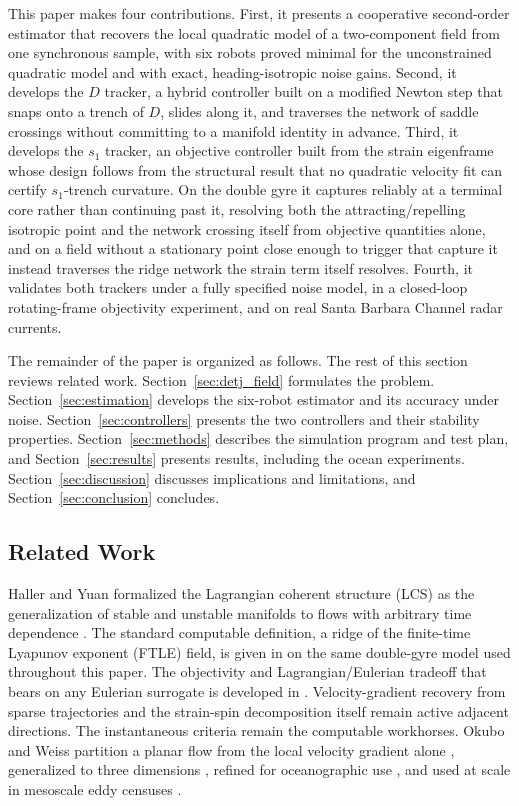 \documentclass[lettersize,journal]{IEEEtran}
\begin{document}
This paper makes four contributions. First, it presents a cooperative
second-order estimator that recovers the local quadratic model of a
two-component field from one synchronous sample, with six robots proved
minimal for the unconstrained quadratic model and with exact,
heading-isotropic noise gains. Second, it
develops the $D$ tracker, a hybrid controller built on a modified
Newton step that snaps onto a trench of $D$, slides along it, and
traverses the network of saddle crossings without committing to a
manifold identity in advance. Third, it develops the
$s_1$ tracker, an objective controller built from the strain
eigenframe whose design follows from the structural result that no
quadratic velocity fit can certify $s_1$-trench curvature. On the
double gyre it captures reliably at a terminal core rather than
continuing past it, resolving both the attracting/repelling isotropic
point and the network crossing itself from objective quantities alone,
and on a field without a stationary point close enough to trigger that
capture it instead traverses the ridge network the strain term itself
resolves. Fourth, it validates both trackers under a fully specified
noise model, in a closed-loop rotating-frame objectivity experiment,
and on real Santa Barbara Channel radar currents.

The remainder of the paper is organized as follows. The rest of this
section reviews related work. Section~\ref{sec:detj_field} formulates
the problem. Section~\ref{sec:estimation} develops the six-robot
estimator and its accuracy under noise. Section~\ref{sec:controllers}
presents the two controllers and their stability properties.
Section~\ref{sec:methods}
describes the simulation program and test plan, and
Section~\ref{sec:results} presents results, including the ocean
experiments. Section~\ref{sec:discussion} discusses implications and
limitations, and Section~\ref{sec:conclusion} concludes.

\subsection{Related Work}
\label{sec:related_robots}

Haller and Yuan formalized the Lagrangian coherent structure (LCS) as
the generalization of stable and unstable manifolds to flows with
arbitrary time dependence \cite{13}. The standard computable definition,
a ridge of the finite-time Lyapunov exponent (FTLE) field, is given in
\cite{15} on the same double-gyre model used throughout this paper. The
objectivity and Lagrangian/Eulerian tradeoff that bears on any Eulerian
surrogate is developed in \cite{24,25,26}. Velocity-gradient
recovery from sparse trajectories \cite{27} and the strain-spin
decomposition itself \cite{28} remain active adjacent directions. The
instantaneous criteria remain the computable workhorses. Okubo and Weiss
partition a planar flow from the local velocity gradient alone
\cite{29,30}, generalized to three dimensions \cite{31}, refined for
oceanographic use \cite{32}, and used at scale in mesoscale eddy censuses
\cite{16}.
\end{document}
